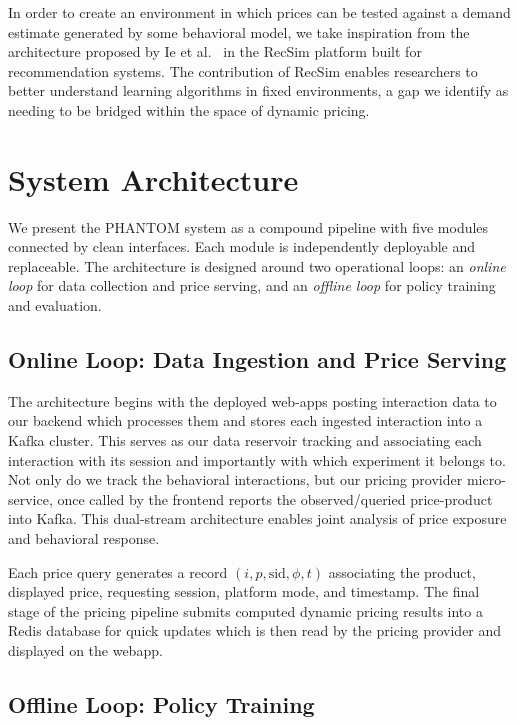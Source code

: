 \documentclass[sigconf]{acmart}
\begin{document}
In order to create an environment in which prices can be tested against a demand estimate generated by some behavioral model, we take inspiration from the architecture proposed by Ie et al.~\cite{ie_recsim_2019} in the RecSim platform built for recommendation systems. The contribution of RecSim enables researchers to better understand learning algorithms in fixed environments, a gap we identify as needing to be bridged within the space of dynamic pricing.


\section{System Architecture}

We present the PHANTOM system as a compound pipeline with five modules connected by clean interfaces. Each module is independently deployable and replaceable. The architecture is designed around two operational loops: an \textit{online loop} for data collection and price serving, and an \textit{offline loop} for policy training and evaluation.

\subsection{Online Loop: Data Ingestion and Price Serving}

The architecture begins with the deployed web-apps posting interaction data to our backend which processes them and stores each ingested interaction into a Kafka cluster. This serves as our data reservoir tracking and associating each interaction with its session and importantly with which experiment it belongs to. Not only do we track the behavioral interactions, but our pricing provider micro-service, once called by the frontend reports the observed/queried price-product into Kafka. This dual-stream architecture enables joint analysis of price exposure and behavioral response.

Each price query generates a record $(i, p, \text{sid}, \phi, t)$ associating the product, displayed price, requesting session, platform mode, and timestamp. The final stage of the pricing pipeline submits computed dynamic pricing results into a Redis database for quick updates which is then read by the pricing provider and displayed on the webapp.

\subsection{Offline Loop: Policy Training}
\end{document}
